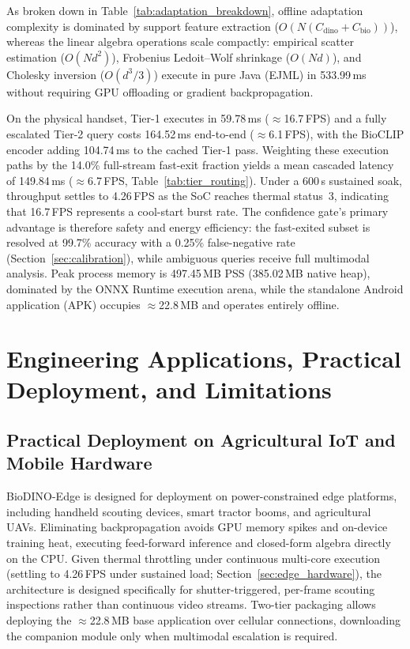 \documentclass[preprint,12pt]{elsarticle}
\begin{document}
As broken down in Table~\ref{tab:adaptation_breakdown}, offline adaptation complexity is dominated by support feature extraction ($O(N(C_{\text{dino}}+C_{\text{bio}}))$), whereas the linear algebra operations scale compactly: empirical scatter estimation ($O(Nd^2)$), Frobenius Ledoit--Wolf shrinkage ($O(Nd)$), and Cholesky inversion ($O(d^3/3)$) execute in pure Java (EJML) in 533.99\,ms without requiring GPU offloading or gradient backpropagation.

On the physical handset, Tier-1 executes in 59.78\,ms ($\approx$16.7\,FPS) and a fully escalated Tier-2 query costs 164.52\,ms end-to-end ($\approx$6.1\,FPS), with the BioCLIP encoder adding 104.74\,ms to the cached Tier-1 pass. Weighting these execution paths by the 14.0\% full-stream fast-exit fraction yields a mean cascaded latency of 149.84\,ms ($\approx$6.7\,FPS, Table~\ref{tab:tier_routing}). Under a 600\,s sustained soak, throughput settles to 4.26\,FPS as the SoC reaches thermal status~3, indicating that 16.7\,FPS represents a cool-start burst rate. The confidence gate's primary advantage is therefore safety and energy efficiency: the fast-exited subset is resolved at 99.7\% accuracy with a 0.25\% false-negative rate (Section~\ref{sec:calibration}), while ambiguous queries receive full multimodal analysis. Peak process memory is 497.45\,MB PSS (385.02\,MB native heap), dominated by the ONNX Runtime execution arena, while the standalone Android application (APK) occupies $\approx$22.8\,MB and operates entirely offline.

\section{Engineering Applications, Practical Deployment, and Limitations}
\label{sec:discussion}

\subsection{Practical Deployment on Agricultural IoT and Mobile Hardware}
BioDINO-Edge is designed for deployment on power-constrained edge platforms, including handheld scouting devices, smart tractor booms, and agricultural UAVs. Eliminating backpropagation avoids GPU memory spikes and on-device training heat, executing feed-forward inference and closed-form algebra directly on the CPU. Given thermal throttling under continuous multi-core execution (settling to 4.26\,FPS under sustained load; Section~\ref{sec:edge_hardware}), the architecture is designed specifically for shutter-triggered, per-frame scouting inspections rather than continuous video streams. Two-tier packaging allows deploying the $\approx$22.8\,MB base application over cellular connections, downloading the companion module only when multimodal escalation is required.
\end{document}
